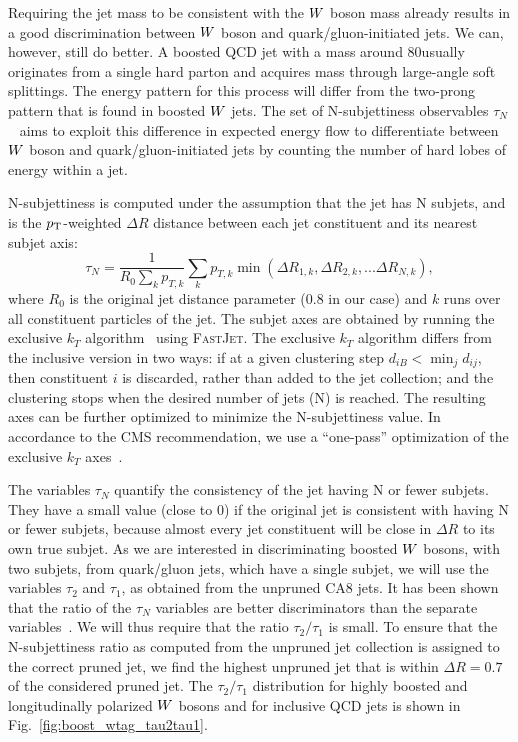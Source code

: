 Requiring the jet mass to be consistent with the $W$ boson mass already results in a good
discrimination between $W$ boson and quark/gluon-initiated jets. We can, however, still do better.
A boosted QCD jet with a mass around 80\GeV usually originates from a single hard parton and
acquires mass through large-angle soft splittings. The energy pattern for this process will differ
from the two-prong pattern that is found in boosted $W$ jets.  
The set of N-subjettiness observables $\tau_N$~\cite{Thaler:2010tr} aims to exploit this difference
in expected energy flow to differentiate between $W$ boson and quark/gluon-initiated jets by
counting the number of hard lobes of energy within a jet.

N-subjettiness is computed under the assumption that the jet has N subjets, and is the
$p_{\mathrm{T}}$-weighted $\Delta R$ distance between each jet constituent and its nearest subjet axis:
\begin{equation}
\tau_N = \frac{1}{R_0 \sum_{k} p_{T, k}} \sum_k p_{T, k} \min (\Delta R_{1,k}, \Delta R_{2,k}, ...
\Delta R_{N,k}),
\end{equation}
where $R_0$ is the original jet distance parameter (0.8 in our case) and $k$ runs over all
constituent particles of the jet. 
The subjet axes are obtained by running the exclusive $k_T$
algorithm~\cite{Ellis:1993tq,Catani:1993hr} using \textsc{FastJet}. 
The exclusive $k_T$ algorithm differs from the inclusive version in two ways: if at a given
clustering step $d_{iB} < \min_j d_{ij}$, then constituent $i$ is discarded, rather than added to
the jet collection; and the clustering stops when the desired number of jets (N) is reached. 
The resulting axes can be further optimized to minimize the N-subjettiness value. In accordance to
the CMS recommendation, we use a “one-pass” optimization of the exclusive $k_T$
axes~\cite{nsubjettiness_fastjet}.

The variables $\tau_N$ quantify the consistency of the jet having N or fewer subjets. They have a
small value (close to 0) if the original jet is consistent with having N or fewer subjets, because
almost every jet constituent will be close in $\Delta R$ to its own true subjet. 
As we are interested in discriminating boosted $W$ bosons, with two subjets, from quark/gluon
jets, which have a single subjet, we will use the variables $\tau_2$ and $\tau_1$, as obtained
from the unpruned CA8 jets.   
It has been shown that the ratio of the $\tau_N$ variables are better discriminators than the
separate variables~\cite{Thaler:2010tr}. We will thus require that the ratio $\tau_2 / \tau_1$ is
small. 
To ensure that the N-subjettiness ratio as computed from the unpruned
jet collection is assigned to the correct pruned jet, we find the highest \pt unpruned jet that is
within $\Delta R = 0.7$ of the considered pruned jet.
The $\tau_2 / \tau_1$ distribution for highly boosted and longitudinally polarized $W$
bosons and for inclusive QCD jets is shown in Fig.~\ref{fig:boost_wtag_tau2tau1}. 

